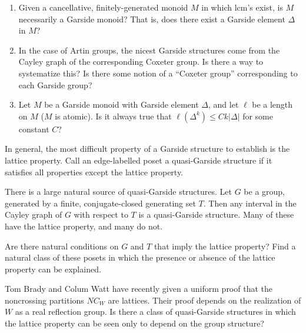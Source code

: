 \documentclass[12pt,letterpaper, reqno]{amsart}
\begin{document}
\begin{problem} 
\begin{enumerate}
\item Given a cancellative, finitely-generated monoid $M$ in which lcm's exist, is $M$ necessarily a Garside monoid? That is, does there exist a Garside element $\Delta$ in $M$?
\item In the case of Artin groups, the nicest Garside structures come from the Cayley graph of the corresponding Coxeter group. Is there a way to systematize this? Is there some notion of a ``Coxeter group'' corresponding to each Garside group?
\item Let $M$ be a Garside monoid with Garside element $\Delta$, and let $\ell$ be a length on $M$ ($M$ is atomic). Is it always true that $\ell(\Delta^k)\leq Ck\left|\Delta\right| $ for some constant $C$?
\end{enumerate}
\end{problem}

\begin{problemblock}
In general, the most difficult property of a Garside structure to establish is the lattice property. Call an edge-labelled poset a {\sf quasi-Garside structure} if it satisfies all properties except the lattice property.

There is a large natural source of quasi-Garside structures. Let $G$
be a group, generated by a finite, conjugate-closed generating set
$T$. Then any interval in the Cayley graph of $G$ with respect to $T$
is a quasi-Garside structure. Many of these have the lattice property,
and many do not. 

\begin{problem}
Are there natural conditions on $G$ and $T$ that imply
the lattice property? Find a natural class of these posets in which the
presence or absence of the lattice property can be explained.
\end{problem}

\begin{remark}
Tom Brady and Colum Watt \cite{brady-watt} have recently given a uniform proof that the noncrossing partitions $NC_W$ are lattices. Their proof depends on the realization of $W$ as a real reflection group. Is there a class of quasi-Garside structures in which the lattice property can be seen only to depend on the group structure?
\end{remark}
\end{problemblock}
\end{document}
